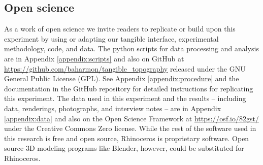 \documentclass[prodmode,acmtochi]{acmsmall} %
\begin{document}











\subsection{Open science} 

% 
%

As a work of open science we invite readers to
replicate or build upon this experiment by 
using or adapting our tangible interface, experimental methodology, code, and data. 
The python scripts for data processing and analysis
are in Appendix \ref{appendix:scripts} and also
on GitHub at \url{https://github.com/baharmon/tangible_topography}
released under the GNU General Public License (GPL).
See Appendix \ref{appendix:procedure}
and the documentation in the GitHub repository 
for detailed instructions for replicating this experiment. 
The data used in this experiment 
and the results -- 
including data, renderings, photographs, and interview notes --
are in Appendix \ref{appendix:data}
and also on the Open Science Framework 
at \url{https://osf.io/82gst/} under the Creative Commons Zero license.
While the rest of the software used in this research is free and open source, 
Rhinoceros is proprietary software. 
Open source 3D modeling programs like Blender, however,
could be substituted for Rhinoceros. 
\end{document}
